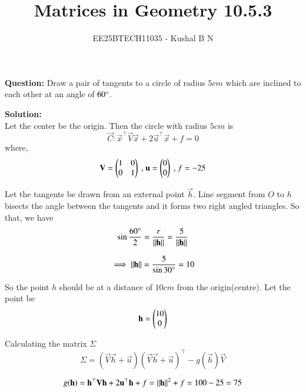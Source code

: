 \documentclass[journal,12pt,onecolumn]{IEEEtran}
\title{Matrices in Geometry 10.5.3}
\author{EE25BTECH11035 - Kushal B N}
\theoremstyle{remark}
\begin{document}
\vspace{3cm}
\maketitle
{\let\newpage\relax\maketitle}
\textbf{Question: }
Draw a pair of tangents to a circle of radius $5cm$ which are inclined to each other at an angle of $60\degree$.

\textbf{Solution: }\\
Let the center be the origin. Then the circle with radius $5cm$ is
\begin{equation}
    \vec{C} : \vec{x}^{\top}\vec{V}\vec{x} + 2\vec{u}^{\top}\vec{x} + f = 0
\end{equation}
where,
\begin{equation}
    \mathbf{V} = \begin{pmatrix}1&0\\0&1\end{pmatrix} \text{ , } \mathbf{u} = \begin{pmatrix}0\\0\end{pmatrix} \text{ , } f = -25
\end{equation}

Let the tangents be drawn from an external point $\vec{h}$.
Line segment from $O$ to $h$ bisects the angle between the tangents and it forms two right angled triangles.
So that, we have
\begin{equation}
    \sin{\frac{60\degree}{2}} = \frac{r}{\left\lVert\mathbf{h}\right\rVert} = \frac{5}{\left\lVert\mathbf{h}\right\rVert}
\end{equation}

\begin{equation}
    \implies \left\lVert\mathbf{h}\right\rVert = \frac{5}{\sin{30\degree}} = 10
\end{equation}

So the point $h$ should be at a distance of $10cm$ from the origin(centre).
Let the point be
\begin{equation}
    \mathbf{h} = \begin{pmatrix}10\\0\end{pmatrix}
\end{equation}

Calculating the matrix $\Sigma$
\begin{equation}
    \Sigma = (\vec{V}\vec{h} + \vec{u})(\vec{V}\vec{h} + \vec{u})^{\top} - g(\vec{h})\vec{V}
\end{equation}

\begin{equation}
    g(\mathbf{h}) = \mathbf{h}^{\top}\mathbf{V}\mathbf{h} + 2\mathbf{u}^{\top}\mathbf{h} + f = \left\lVert\mathbf{h}\right\rVert^2 + f = 100 - 25 = 75
\end{equation}
\end{document}
